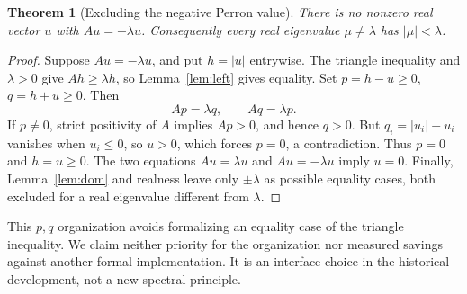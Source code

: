 \documentclass[11pt]{article}
\newtheorem{theorem}{Theorem}[section]
\begin{document}
\begin{theorem}[Excluding the negative Perron value]\label{thm:minus}
There is no nonzero real vector $u$ with $Au=-\lambda u$.
Consequently every real eigenvalue $\mu\ne\lambda$ has $|\mu|<\lambda$.
\end{theorem}
\begin{proof}
Suppose $Au=-\lambda u$, and put $h=|u|$ entrywise. The triangle inequality
and $\lambda>0$ give $Ah\ge\lambda h$, so Lemma~\ref{lem:left} gives equality.
Set $p=h-u\ge0$, $q=h+u\ge0$. Then
\[
 Ap=\lambda q,\qquad Aq=\lambda p.
\]
If $p\ne0$, strict positivity of $A$ implies $Ap>0$, and hence $q>0$.
But $q_i=|u_i|+u_i$ vanishes when $u_i\le0$, so $u>0$, which forces
$p=0$, a contradiction. Thus $p=0$ and $h=u\ge0$. The two equations
$Au=\lambda u$ and $Au=-\lambda u$ imply $u=0$. Finally,
Lemma~\ref{lem:dom} and realness leave only $\pm\lambda$ as possible equality
cases, both excluded for a real eigenvalue different from $\lambda$.
\end{proof}

This $p,q$ organization avoids formalizing an equality case of the triangle
inequality. We claim neither priority for the organization nor measured savings
against another formal implementation. It is an interface choice in the
historical development, not a new spectral principle.
\end{document}
